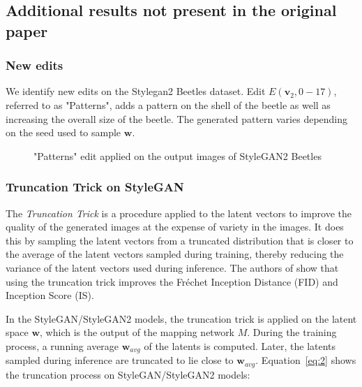 \subsection{Additional results not present in the original paper}

\subsubsection{New edits}

We identify new edits on the Stylegan2 Beetles dataset. Edit $E(\textbf{v}_{2}, 0-17)$, referred to as "Patterns", adds a pattern on the shell of the beetle as well as increasing the overall size of the beetle. The generated pattern varies depending on the seed used to sample $\textbf{w}$.

\begin{figure}[H]



\caption{"Patterns" edit applied on the output images of StyleGAN2 Beetles}

\end{figure}

\subsubsection{Truncation Trick on StyleGAN}

The \emph{Truncation Trick} is a procedure applied to the latent vectors to improve the quality of the generated images at the expense of variety in the images. It does this by sampling the latent vectors from a truncated distribution that is closer to the average of the latent vectors sampled during training, thereby reducing the variance of the latent vectors used during inference. The authors of \cite{biggan} show that using the truncation trick improves the Fréchet Inception Distance (FID) and Inception Score (IS).

In the StyleGAN/StyleGAN2 models, the truncation trick is applied on the latent space $\textbf{w}$, which is the output of the mapping network $M$. During the training process, a running average $\textbf{w}_{avg}$ of the latents is computed. Later, the latents sampled during inference are truncated to lie close to $\textbf{w}_{avg}$. Equation~\ref{eq:2} shows the truncation process on StyleGAN/StyleGAN2 models:

